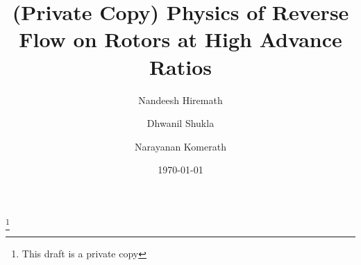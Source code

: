 \documentclass[%
 reprint,
 showkeys,
 amsmath,amssymb,
 aps,
]{revtex4-1}
\begin{document}

\title{(Private Copy) Physics of Reverse Flow on Rotors at High Advance Ratios}%
\thanks{This draft is a private copy}%

\author{Nandeesh Hiremath}
\author{Dhwanil Shukla}%
\author{Narayanan Komerath}
%


\date{\today}%
\end{document}
